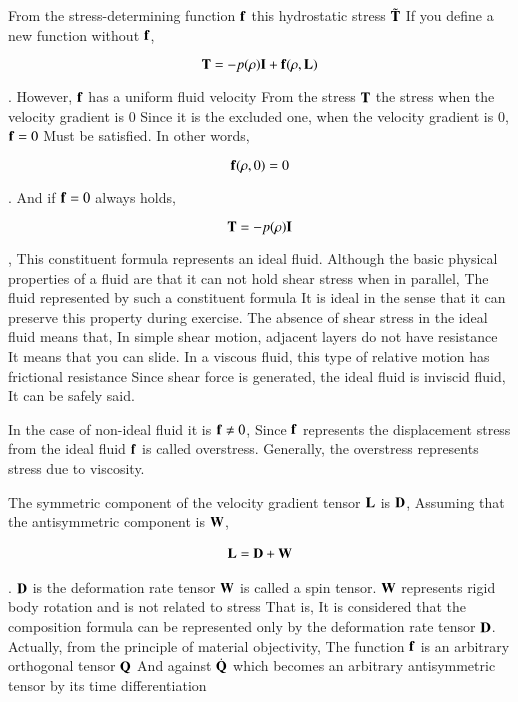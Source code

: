 From the stress-determining function $\mathbf{f}$ this hydrostatic stress $\tilde{\mathbf{T}}$
If you define a new function without $\mathbf{f}$,

\begin{equation}
{\mathbf{T}}=-p(\rho){\mathbf{I}}+{\mathbf{f}}(\rho,{\mathbf{L}})
\end{equation}

. However, $\mathbf{f}$ has a uniform fluid velocity
From the stress $\mathbf{T}$ the stress when the velocity gradient is 0
Since it is the excluded one, when the velocity gradient is 0, $\mathbf{f}=0$
Must be satisfied. In other words,

\begin{equation}
{\mathbf{f}}(\rho,0)=0
\end{equation}

. And if $\mathbf{f}=0$ always holds,

\begin{equation}
{\mathbf{T}}=-p(\rho){\mathbf{I}}
\end{equation}

, This constituent formula represents an ideal fluid.
Although the basic physical properties of a fluid are that it can not hold shear stress when in parallel,
The fluid represented by such a constituent formula
It is ideal in the sense that it can preserve this property during exercise.
The absence of shear stress in the ideal fluid means that,
In simple shear motion, adjacent layers do not have resistance
It means that you can slide.
In a viscous fluid, this type of relative motion has frictional resistance
Since shear force is generated, the ideal fluid is inviscid fluid,
It can be safely said.

In the case of non-ideal fluid it is $\mathbf{f}\ne0$,
Since $\mathbf{f}$ represents the displacement stress from the ideal fluid
$\mathbf{f}$ is called overstress.
Generally, the overstress represents stress due to viscosity.

The symmetric component of the velocity gradient tensor $\mathbf{L}$ is $\mathbf{D}$,
Assuming that the antisymmetric component is $\mathbf{W}$,

\begin{eqnarray}
{\mathbf{L}} = {\mathbf{D}} + {\mathbf{W}}
\end{eqnarray}

. $\mathbf{D}$ is the deformation rate tensor
$\mathbf{W}$ is called a spin tensor.
$\mathbf{W}$ represents rigid body rotation and is not related to stress That is,
It is considered that the composition formula can be represented only by the deformation rate tensor $\mathbf{D}$.
Actually, from the principle of material objectivity,
The function $\mathbf{f}$ is an arbitrary orthogonal tensor $\mathbf{Q}$
And against $\dot{\mathbf{Q}}$ which becomes an arbitrary antisymmetric tensor by its time differentiation

